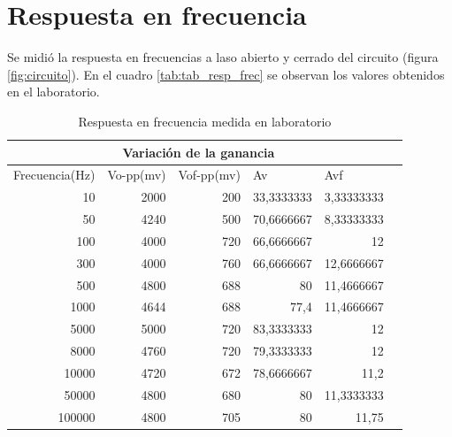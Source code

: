 \documentclass[12pt, letterpaper]{article}
\begin{document}
\section{Respuesta en frecuencia}
Se midió la respuesta en frecuencias a laso abierto y cerrado del circuito (figura \ref{fig:circuito}). En el cuadro \ref{tab:tab_resp_frec} se observan los valores obtenidos en el laboratorio.
\begin{table}[H]
    \centering
    \caption{Respuesta en frecuencia medida en laboratorio}
    \begin{tabular}{|r|r|r|r|r|r}
        
    \hline \multicolumn{5}{|c|}{Variación de la ganancia} &  \\
    
    \hline  \multicolumn{1}{|l|}{Frecuencia(Hz)} & \multicolumn{1}{l|}{Vo-pp(mv)} & \multicolumn{1}{l|}{Vof-pp(mv)} & \multicolumn{1}{l|}{Av} & \multicolumn{1}{l|}{Avf} &  \\
    
    \cmidrule    10    & 2000  & 200   & 33,3333333 & 3,33333333 &  \\
    
    \cmidrule   50    & 4240  & 500   & 70,6666667 & 8,33333333 &  \\
    
    \cmidrule    100   & 4000  & 720   & 66,6666667 & 12    &  \\
    
    \cmidrule    300   & 4000  & 760   & 66,6666667 & 12,6666667 &  \\
    
    \cmidrule    500   & 4800  & 688   & 80    & 11,4666667 &  \\
    
    \cmidrule    1000  & 4644  & 688   & 77,4  & 11,4666667 &  \\
    
    \cmidrule    5000  & 5000  & 720   & 83,3333333 & 12    &  \\
    
    \cmidrule   8000  & 4760  & 720   & 79,3333333 & 12    &  \\
    
    \cmidrule   10000 & 4720  & 672   & 78,6666667 & 11,2  &  \\
    
    \cmidrule    50000 & 4800  & 680   & 80    & 11,3333333 &  \\
    
    \cmidrule   100000 & 4800  & 705   & 80    & 11,75 &  \\
    

\end{tabular}
\end{table}
\end{document}
